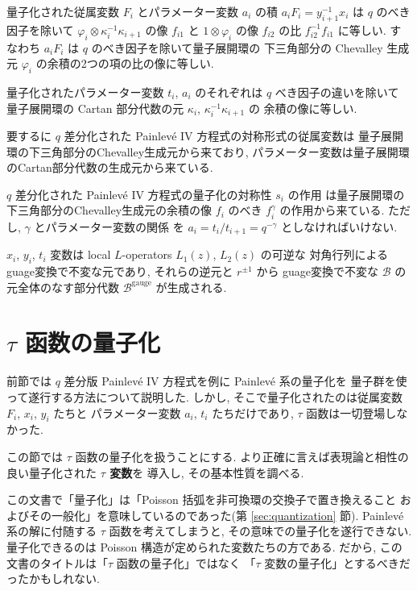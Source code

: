 \documentclass[12pt,twoside,dvipdfm]{msjproc}
\theoremstyle{definition} %
\theoremstyle{definition} %
\theoremstyle{definition} %
\numberwithin{theorem}{section}
\numberwithin{equation}{section}
\numberwithin{figure}{section}
\numberwithin{table}{section}
\newcommand\secref[1]{第 \ref{#1} 節}
\newcommand\B{\mathcal{B}}
\newcommand\gauge{{\mathrm{gauge}}}
\begin{document}
量子化された従属変数 $F_i$ とパラメーター変数 $a_i$ の積 $a_i F_i = y_{i+1}^{-1}x_i$ 
は $q$ のべき因子を除いて $\varphi_i\otimes\kappa_i^{-1}\kappa_{i+1}$ の像 $f_{i1}$ 
と $1\otimes \varphi_i$ の像 $f_{i2}$ の比 $f_{i2}^{-1}f_{i1}$ に等しい. 
すなわち $a_i F_i$ は $q$ のべき因子を除いて量子展開環の
下三角部分の Chevalley 生成元 $\varphi_i$ の余積の2つの項の比の像に等しい.

量子化されたパラメーター変数 $t_i$, $a_i$ のそれぞれは $q$ べき因子の違いを除いて
量子展開環の Cartan 部分代数の元 $\kappa_i$, $\kappa_i^{-1}\kappa_{i+1}$ の
余積の像に等しい.

要するに $q$ 差分化された Painlev\'e IV 方程式の対称形式の従属変数は
量子展開環の下三角部分のChevalley生成元から来ており,
パラメーター変数は量子展開環のCartan部分代数の生成元から来ている.

$q$ 差分化された Painlev\'e IV 方程式の量子化の対称性 $s_i$ の作用
は量子展開環の下三角部分のChevalley生成元の余積の像 $f_i$ のべき $f_i^\gamma$
の作用から来ている. ただし, $\gamma$ とパラメーター変数の関係
を $a_i=t_i/t_{i+1}=q^{-\gamma}$ としなければいけない.

$x_i$, $y_i$, $t_i$ 変数は local $L$-operators $L_1(z)$, $L_2(z)$ の可逆な
対角行列によるguage変換で不変な元であり, それらの逆元と $r^{\pm1}$ から
guage変換で不変な $\B$ の元全体のなす部分代数 $\B^\gauge$ が生成される.





\section{$\tau$ 函数の量子化}

前節では $q$ 差分版 Painlev\'e IV 方程式を例に Painlev\'e 系の量子化を
量子群を使って遂行する方法について説明した.
しかし, そこで量子化されたのは従属変数 $F_i$, $x_i$, $y_i$ たちと
パラメーター変数 $a_i$, $t_i$ たちだけであり, 
$\tau$ 函数は一切登場しなかった.

この節では $\tau$ 函数の量子化を扱うことにする.
より正確に言えば表現論と相性の良い量子化された {\bf $\tau$ 変数}を
導入し, その基本性質を調べる.

この文書で「量子化」は「Poisson 括弧を非可換環の交換子で置き換えること
およびその一般化」を意味しているのであった(\secref{sec:quantization}).
Painlev\'e 系の解に付随する $\tau$ 函数を考えてしまうと, 
その意味での量子化を遂行できない.
量子化できるのは Poisson 構造が定められた変数たちの方である.
だから, この文書のタイトルは「$\tau$ 函数の量子化」ではなく
「$\tau$ 変数の量子化」とするべきだったかもしれない.
\end{document}
